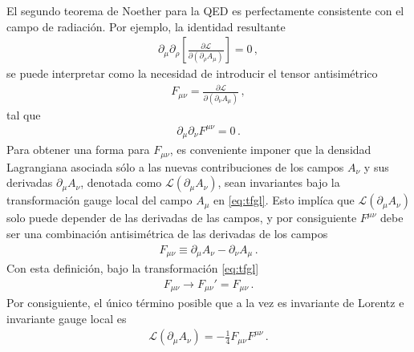 \begin{frame}
El segundo teorema de Noether para la QED es perfectamente consistente con el campo de radiación. Por ejemplo,
la identidad resultante
\begin{align}
   \partial_{\mu} \partial_{\rho}\left[ \frac{\partial \mathcal{L}}{\partial \left(  \partial_{\rho} A_{\mu}\right)}  \right]=0\,,
\end{align}
se puede interpretar como la necesidad de introducir el tensor antisimétrico
\begin{align}
  F_{\mu\nu}=\frac{\partial \mathcal{L}}{\partial \left( \partial_{\nu} A_{\mu}\right)}\,,
\end{align}
tal que
\begin{align}
  \partial_{\mu}\partial_{\nu}F^{\mu\nu}=0\,.
\end{align}
Para obtener una forma para $F_{\mu\nu}$, es conveniente imponer que la densidad Lagrangiana asociada sólo a las nuevas contribuciones de los campos $A_{\nu}$ y sus derivadas $\partial_{\mu}A_{\nu}$, denotada como $\mathcal{L}\left( \partial_{\mu}A_{\nu}\right)$,
sean invariantes  bajo la transformación gauge local  del campo $A_{\mu}$ en \eqref{eq:tfgl}. Esto implíca que $\mathcal{L}\left( \partial_{\mu}A_{\nu}\right)$  solo puede depender de las derivadas de las campos, y por consiguiente $F^{\mu\nu}$ debe ser una combinación antisimétrica de las derivadas de los campos
\begin{align}
  F_{\mu\nu}\equiv\partial_{\mu}A_{\nu}-\partial_{\nu}A_{\mu}\,.
\end{align}
Con esta definición, bajo la transformación  \eqref{eq:tfgl}
\begin{align}
  F_{\mu\nu}\to F_{\mu\nu}'=F_{\mu\nu}\,.
\end{align}
Por consiguiente, el único término posible que a la vez es invariante de Lorentz e invariante gauge local es
\begin{align}
 \mathcal{L}\left( \partial_{\mu}A_{\nu}\right)=-\frac{1}{4}F_{\mu\nu}F^{\mu\nu}\,.
\end{align}



\end{frame} 



